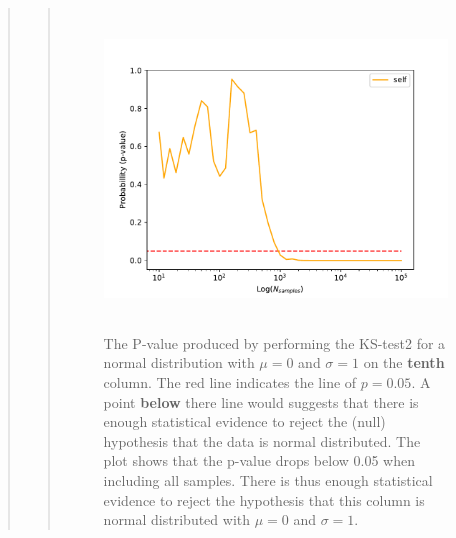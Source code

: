 \begin{quote}
\begin{quote}
\begin{figure}[!ht]
\centering
\includegraphics[width=14cm, height=8.5cm]{./Plots/1e_plot_column_9.pdf}
\caption{The P-value produced by performing the KS-test2 for a normal distribution with $\mu = 0$ and $\sigma = 1$ on the \textbf{tenth} column.  The red line indicates the line of $ p = 0.05$. A point \textbf{below} there  line would suggests that there is enough statistical evidence to reject the (null) hypothesis that the data is normal distributed. The plot shows that the p-value drops below 0.05 when including all samples. There is thus enough statistical evidence to reject the hypothesis that this column is normal distributed with $\mu = 0$ and $\sigma = 1$.}
\end{figure}
\end{quote}



\end{quote}

\newpage

%

%


%
\newpage











